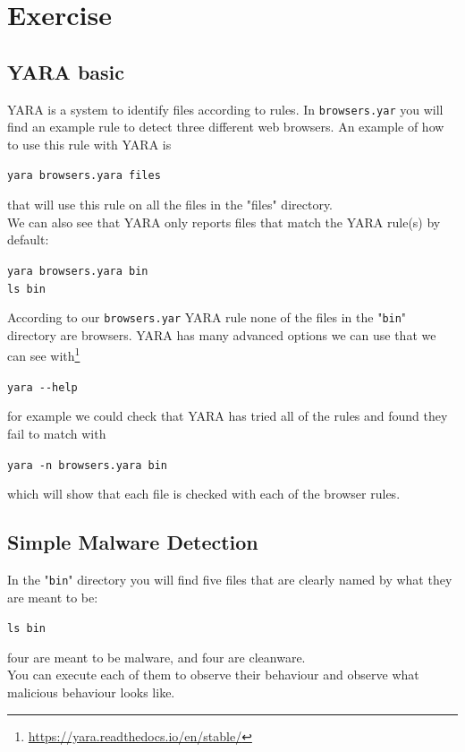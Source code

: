 \documentclass{article}
\begin{document}
\section{Exercise}
\subsection{YARA basic}
YARA is a system to identify files according to rules. In \lstinline{browsers.yar} you
will find an example rule to detect three different web browsers.
An example of how to use this rule with YARA is
\begin{center}
    \lstinline{yara browsers.yara files}
\end{center}
\noindent that will use this rule on all the files in the "files" directory.\\

\noindent We can also see that YARA only reports files that match the YARA
rule(s) by default:
\begin{center}
    \lstinline{yara browsers.yara bin}\\
    \lstinline{ls bin}
\end{center}
\noindent According to our \lstinline{browsers.yar} YARA rule none of the files in the "\lstinline{bin}" directory are browsers.
YARA has many advanced options we can use that we can see with\footnote{\url{https://yara.readthedocs.io/en/stable/}}
\begin{center}
    \lstinline{yara --help}
\end{center}
\noindent for example we could check that YARA has tried all of the rules and found
they fail to match with
\begin{center}
    \lstinline{yara -n browsers.yara bin}
\end{center}
\noindent which will show that each file is checked with each of the browser rules.

\subsection{Simple Malware Detection}
In the "\lstinline{bin}" directory you will find five files that are clearly named by what they are meant to be:
\begin{center}
    \lstinline{ls bin}
\end{center}
\noindent four are meant to be malware, and four are cleanware.\\

\noindent You can execute each of them to observe their behaviour and observe
what malicious behaviour looks like.\\
\end{document}
